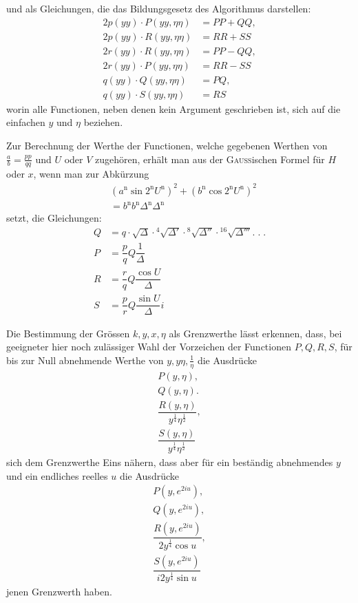 und als Gleichungen, die das Bildungsgesetz des Algorithmus darstellen:
\[
\begin{aligned}
2p(yy)\cdot P(yy,\eta\eta)&=PP+QQ,\\[5pt]
2p(yy)\cdot R(yy,\eta\eta)&=RR+SS\\[5pt]
2r(yy)\cdot R(yy,\eta\eta)&=PP-QQ,\\[5pt]
2r(yy)\cdot P(yy,\eta\eta)&=RR-SS\\[5pt]
q(yy)\cdot Q(yy,\eta\eta)&=PQ,\\[5pt]
q(yy)\cdot S(yy,\eta\eta)&=RS
\end{aligned}
\]
worin alle Functionen, neben denen kein Argument geschrieben ist, sich auf die einfachen $y$ und $\eta$ beziehen.


Zur Berechnung der Werthe der Functionen, welche gegebenen Werthen von $\frac ab=\frac{pp}{qq}$ und $U$ oder $V$ zugehören, erhält man aus der \textsc{Gauss}ischen Formel für $H$ oder $x$, wenn man zur Abkürzung
\[
\begin{aligned}&(a^{\mathrm n}\sin 2^{\mathrm n} U^{\mathrm n})^2+(b^{\mathrm n}\cos 2^{\mathrm n} U^{\mathrm n})^2\\[5pt]&=b^{\mathrm n} b^{\mathrm n}\Delta^{\mathrm n}\Delta^{\mathrm n}\end{aligned}
\]
setzt, die Gleichungen:
\[
\begin{aligned}
Q&=q\cdot\surd \Delta\cdot{}^{4}\!\surd {\Delta'}\cdot{}^{8}\!\surd {\Delta''}\cdot{}^{16}\!\surd {\Delta'''}.\;.\;.\\[9pt]
P&=\dfrac pq Q\dfrac1\Delta\\[9pt]
R&=\dfrac rq Q\dfrac{\cos U}{\Delta}\\[9pt]
S&=\dfrac pr Q\dfrac{\sin U}{\Delta}i
\end{aligned}
\]

Die Bestimmung der Grössen $k,\allowbreak y,\allowbreak x,\allowbreak \eta$ als Grenzwerthe lässt erkennen, dass, bei geeigneter hier noch zulässiger Wahl der Vorzeichen der Functionen $P,\allowbreak Q,\allowbreak R,\allowbreak S$, für bis zur Null abnehmende Werthe von $y,\allowbreak y\eta,\allowbreak \frac1\eta$ die Ausdrücke
\[
\begin{gathered}P(y,\eta),\\[6pt] Q(y,\eta).\\[6pt]
\dfrac{R(y,\eta)}{y^{\frac14}\eta^{\frac12}},\\[6pt]
\dfrac{S(y,\eta)}{y^{\frac14}\eta^{\frac12}}\end{gathered}
\]
sich dem Grenzwerthe Eins nähern, dass aber für ein beständig abnehmendes $y$ und ein endliches reelles $u$ die Ausdrücke
\[
\begin{gathered}P(y,e^{2iu}),\\[6pt] Q(y,e^{2iu}),\\[6pt]
\dfrac{R(y,e^{2iu})}{2y^{\frac14}\cos u},\\[6pt]
\dfrac{S(y,e^{2iu})}{i2y^{\frac14}\sin u}\end{gathered}
\]
jenen Grenzwerth haben.

